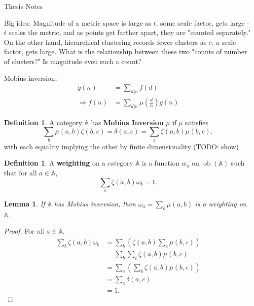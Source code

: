 \documentclass{article}
\newcommand{\Aa}{\mathbb{A}}
\DeclareMathOperator{\ob}{ob}
\newtheorem{sumMobiusWeighting}[cc]{Lemma}
\theoremstyle{definition}
\newtheorem{defCatMobius}[cc]{Definition}
\newtheorem{defWeighting}[cc]{Definition}
\begin{document}
\begin{center}{\Large Thesis Notes}\\ \vspace{1 ex} \end{center}


\vspace{2 ex}
\noindent

Big idea: Magnitude of a metric space is large as $t$, some scale factor, gets large - $t$ scales the metric, and as points get farther apart, they are "counted separately." On the other hand, hierarchical clustering records fewer clusters as $r$, a scale factor, gets large. What is the relationship between these two "counts of number of clusters?" Is magnitude even such a count?

Mobius inversion:
\begin{align*}
g(n) &= \sum_{d | n} f(d) \\
\Rightarrow f(n) &= \sum_{d | n} \mu(\frac dn) g(n)
\end{align*}

\begin{defCatMobius}
A category $\Aa$ has \textbf{Mobius Inversion} $\mu$ if $\mu$ satisfies
\[
\sum_b \mu(a,b)\zeta(b,c) = \delta(a,c) = \sum_b \zeta(a,b)\mu(b,c),
\]
with each equality implying the other by finite dimensionality (TODO: show)
\end{defCatMobius}
\begin{defWeighting}
A \textbf{weighting} on a category $\Aa$ is a function $w_a$ on $\ob(\Aa)$ such that for all $a \in \Aa$,
\[
\sum_b \zeta(a,b)\omega_b = 1.
\]
\end{defWeighting}
\begin{sumMobiusWeighting}
If $\Aa$ has Mobius inversion, then $\omega_a = \sum_b \mu(a,b)$ is a weighting on $\Aa$.
\end{sumMobiusWeighting}
\begin{proof} For all $a \in \Aa$,
\begin{align*}
\sum_b \zeta(a,b)\omega_b &= \sum_b\left( \zeta(a,b)\sum_c \mu(b,c)\right)\\
&=\sum_b\sum_c\zeta(a,b)\mu(b,c)\\
&=\sum_c\left(\sum_b\zeta(a,b)\mu(b,c)\right)\\
&=\sum_c \delta(a,c)\\
&=1.
\end{align*}
\end{proof}
\end{document}
